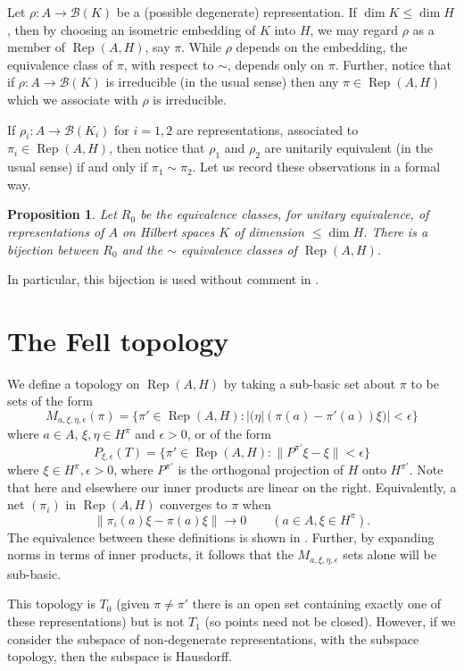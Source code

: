 \documentclass[a4paper,11pt]{article}
\newcommand{\mc}[1]{{\mathcal{#1}}}
\newcommand{\Rep}{\operatorname{Rep}}
\newtheorem{proposition}[lemma]{Proposition}
\begin{document}
Let $\rho:A\rightarrow\mc B(K)$ be a (possible degenerate) representation.
If $\dim K \leq \dim H$, then by choosing an isometric embedding of $K$ into
$H$, we may regard $\rho$ as a member of $\Rep(A,H)$, say $\pi$.  While $\rho$ depends on the embedding, the equivalence class of $\pi$, with respect to
$\sim$, depends only on $\pi$.
Further, notice that if $\rho:A\rightarrow\mc B(K)$ is irreducible (in the
usual sense) then any $\pi\in\Rep(A,H)$ which we associate with $\rho$ is
irreducible.

If $\rho_i:A\rightarrow\mc B(K_i)$ for $i=1,2$ are representations,
associated to $\pi_i\in\Rep(A,H)$, then notice that $\rho_1$ and $\rho_2$
are unitarily equivalent (in the usual sense) if and only if $\pi_1\sim\pi_2$.
Let us record these observations in a formal way.

\begin{proposition}
Let $R_0$ be the equivalence classes, for unitary equivalence, of
representations of $A$ on Hilbert spaces $K$ of dimension $\leq\dim H$.
There is a bijection between $R_0$ and the $\sim$ equivalence classes of
$\Rep(A,H)$.
\end{proposition}

In particular, this bijection is used without comment in
\cite[Section~2]{fell2}.


\section{The Fell topology}

We define a topology on $\Rep(A,H)$ by taking a sub-basic set about $\pi$
to be sets of the form
\[ M_{a,\xi,\eta,\epsilon}(\pi) =
\big\{ \pi'\in\Rep(A,H) : |(\eta|(\pi(a)-\pi'(a))\xi)|<\epsilon \big\} \]
where $a\in A$, $\xi,\eta\in H^\pi$ and $\epsilon>0$, or of the form
\[ P_{\xi,\epsilon}(T) = \{ \pi'\in\Rep(A,H) : \|P^{\pi'}\xi - \xi\|
< \epsilon \} \]
where $\xi\in H^\pi, \epsilon>0$, where $P^{\pi'}$ is the orthogonal
projection of $H$ onto $H^{\pi'}$.  Note that here
and elsewhere our inner products are linear on the right.
Equivalently, a net $(\pi_i)$ in $\Rep(A,H)$ converges to $\pi$ when
\[ \|\pi_i(a)\xi - \pi(a)\xi\| \rightarrow 0 \qquad (a\in A,\xi\in H^\pi). \]
The equivalence between these definitions is shown in \cite[page~239]{fell2}.
Further, by expanding norms in terms of inner products, it follows that
the $M_{a,\xi,\eta,\epsilon}$ sets alone will be sub-basic.

This topology is $T_0$ (given
$\pi\not=\pi'$ there is an open set containing exactly one of these
representations) but is not $T_1$ (so points need not be closed).  However,
if we consider the subspace of non-degenerate representations, with the
subspace topology, then the subspace is Hausdorff.
\end{document}

